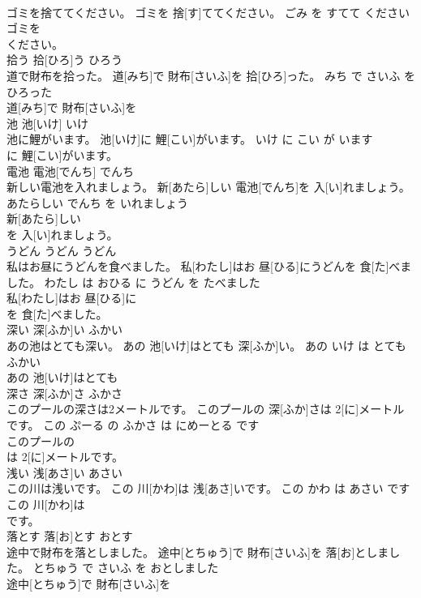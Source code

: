 \documentclass[8pt]{extreport}
\begin{document}
\begin{CJK}{UTF8}{min}
\\	ゴミを捨ててください。	ゴミを 捨[す]ててください。	ごみ を すてて ください	
\\	ゴミを
\\	ください。		
\\	拾う	拾[ひろ]う	ひろう	
\\	道で財布を拾った。	道[みち]で 財布[さいふ]を 拾[ひろ]った。	みち で さいふ を ひろった	
\\	道[みち]で 財布[さいふ]を
\\	池	池[いけ]	いけ	
\\	池に鯉がいます。	池[いけ]に 鯉[こい]がいます。	いけ に こい が います	
\\	に 鯉[こい]がいます。		
\\	電池	電池[でんち]	でんち	
\\	新しい電池を入れましょう。	新[あたら]しい 電池[でんち]を 入[い]れましょう。	あたらしい でんち を いれましょう	
\\	新[あたら]しい
\\	を 入[い]れましょう。		
\\	うどん	うどん	うどん	
\\	私はお昼にうどんを食べました。	私[わたし]はお 昼[ひる]にうどんを 食[た]べました。	わたし は おひる に うどん を たべました	
\\	私[わたし]はお 昼[ひる]に
\\	を 食[た]べました。		
\\	深い	深[ふか]い	ふかい	
\\	あの池はとても深い。	あの 池[いけ]はとても 深[ふか]い。	あの いけ は とても ふかい	
\\	あの 池[いけ]はとても
\\	深さ	深[ふか]さ	ふかさ	
\\	このプールの深さは2メートルです。	このプールの 深[ふか]さは 2[に]メートルです。	この ぷーる の ふかさ は にめーとる です	
\\	このプールの
\\	は 2[に]メートルです。		
\\	浅い	浅[あさ]い	あさい	
\\	この川は浅いです。	この 川[かわ]は 浅[あさ]いです。	この かわ は あさい です	
\\	この 川[かわ]は
\\	です。		
\\	落とす	落[お]とす	おとす	
\\	途中で財布を落としました。	途中[とちゅう]で 財布[さいふ]を 落[お]としました。	とちゅう で さいふ を おとしました	
\\	途中[とちゅう]で 財布[さいふ]を

\end{CJK}
\end{document}
